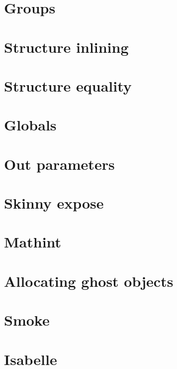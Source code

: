 \documentclass[preprint,nocopyrightspace]{sigplanconf}
\begin{document}
\ifdense
\renewcommand{\labelitemi}{{\footnotesize \centeroncapheight{$\bullet$}}}
\fi









\appendix




\section{Groups}
\section{Structure inlining}
\section{Structure equality}
\section{Globals}
\section{Out parameters}
\section{Skinny expose}
\section{Mathint}
\section{Allocating ghost objects}
\section{Smoke}
\section{Isabelle}

\end{document}
